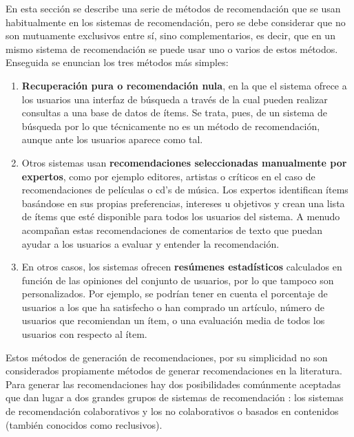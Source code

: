 \documentclass[12pt,letterpaper,oneside] {memoir}
\begin{document}
En esta sección se describe una serie de métodos de recomendación que se usan habitualmente en los sistemas de recomendación, pero se debe considerar que no son mutuamente exclusivos entre sí, sino complementarios, es decir, que en un mismo sistema de recomendación  se puede usar uno o varios de estos métodos. \\
Enseguida se enuncian  los tres métodos más simples:

\begin{enumerate}
\item \textbf{Recuperación pura o recomendación nula}, en la que el sistema ofrece a los usuarios una interfaz de búsqueda a través de la cual pueden realizar consultas a una base de datos de ítems. Se trata, pues, de un sistema de búsqueda por lo que técnicamente no es un método de recomendación, aunque ante los usuarios aparece como tal.
\item Otros sistemas usan \textbf{recomendaciones seleccionadas manualmente por expertos}, como por ejemplo editores, artistas o críticos en el caso de recomendaciones de películas o cd's de música. Los expertos identifican ítems basándose en sus propias preferencias, intereses u objetivos y crean una lista de ítems que esté disponible para todos los usuarios del sistema. A menudo acompañan estas recomendaciones de comentarios de texto que puedan ayudar a los usuarios a evaluar y entender la recomendación.
\item En otros casos, los sistemas ofrecen \textbf{resúmenes estadísticos} calculados en función de las opiniones del conjunto de usuarios, por lo que tampoco son personalizados. Por ejemplo, se podrían tener en cuenta el porcentaje de usuarios a los que ha satisfecho o han comprado un artículo, número de usuarios que recomiendan un ítem, o una evaluación media de todos los usuarios con respecto al ítem.
\end{enumerate}

Estos métodos de generación de recomendaciones, por su simplicidad no son considerados propiamente métodos de generar recomendaciones en la literatura. Para generar las recomendaciones hay dos posibilidades comúnmente aceptadas que dan lugar a dos grandes grupos de sistemas de recomendación \citep{Yager2003, Porcel2004}: los sistemas de recomendación colaborativos y los no colaborativos o basados en contenidos (también conocidos como reclusivos).
\end{document}

